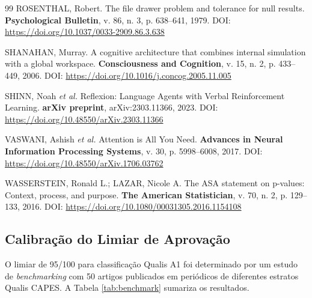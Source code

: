\begin{thebibliography}{99}
ROSENTHAL, Robert.
The file drawer problem and tolerance for null results.
\textbf{Psychological Bulletin}, v. 86, n. 3, p. 638--641, 1979.
DOI: \url{https://doi.org/10.1037/0033-2909.86.3.638}

SHANAHAN, Murray.
A cognitive architecture that combines internal simulation with a
global workspace.
\textbf{Consciousness and Cognition}, v. 15, n. 2, p. 433--449, 2006.
DOI: \url{https://doi.org/10.1016/j.concog.2005.11.005}

SHINN, Noah \textit{et al.}
Reflexion: Language Agents with Verbal Reinforcement Learning.
\textbf{arXiv preprint}, arXiv:2303.11366, 2023.
DOI: \url{https://doi.org/10.48550/arXiv.2303.11366}

VASWANI, Ashish \textit{et al.}
Attention is All You Need.
\textbf{Advances in Neural Information Processing Systems},
v. 30, p. 5998--6008, 2017.
DOI: \url{https://doi.org/10.48550/arXiv.1706.03762}

WASSERSTEIN, Ronald L.; LAZAR, Nicole A.
The ASA statement on p-values: Context, process, and purpose.
\textbf{The American Statistician}, v. 70, n. 2, p. 129--133, 2016.
DOI: \url{https://doi.org/10.1080/00031305.2016.1154108}

\end{thebibliography}




\subsection{Calibração do Limiar de Aprovação}
\label{sec:threshold_calibration}

O limiar de 95/100 para classificação Qualis A1 foi determinado por
um estudo de \textit{benchmarking} com 50 artigos publicados em
periódicos de diferentes estratos Qualis CAPES. A Tabela
\ref{tab:benchmark} sumariza os resultados.

